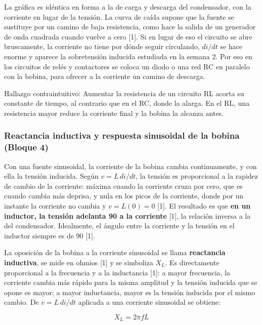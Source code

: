 \documentclass[11pt,letterpaper]{article}
\begin{document}
La gráfica es idéntica en forma a la de carga y descarga del condensador, con la corriente en lugar de la tensión. La curva de caída supone que la fuente se sustituye por un camino de baja resistencia, como hace la salida de un generador de onda cuadrada cuando vuelve a cero [1]. Si en lugar de eso el circuito se abre bruscamente, la corriente no tiene por dónde seguir circulando, $di/dt$ se hace enorme y aparece la sobretensión inducida estudiada en la semana 2. Por eso en los circuitos de relés y contactores se coloca un diodo o una red RC en paralelo con la bobina, para ofrecer a la corriente un camino de descarga.

\begin{nota}{Hallazgo contraintuitivo:}
Aumentar la resistencia de un circuito RL acorta su constante de tiempo, al contrario que en el RC, donde la alarga. En el RL, una resistencia mayor reduce la corriente final y la bobina la alcanza antes.
\end{nota}

\subsubsection{Reactancia inductiva y respuesta sinusoidal de la bobina (Bloque 4)}

Con una fuente sinusoidal, la corriente de la bobina cambia continuamente, y con ella la tensión inducida. Según $v = L\,di/dt$, la tensión es proporcional a la rapidez de cambio de la corriente: máxima cuando la corriente cruza por cero, que es cuando cambia más deprisa, y nula en los picos de la corriente, donde por un instante la corriente no cambia y $v = L(0) = 0$ [1]. El resultado es que \textbf{en un inductor, la tensión adelanta 90\textdegree{} a la corriente} [1], la relación inversa a la del condensador. Idealmente, el ángulo entre la corriente y la tensión en el inductor siempre es de 90\textdegree{} [1].

La oposición de la bobina a la corriente sinusoidal se llama \textbf{reactancia inductiva}, se mide en ohmios [1] y se simboliza $X_L$. Es directamente proporcional a la frecuencia y a la inductancia [1]: a mayor frecuencia, la corriente cambia más rápido para la misma amplitud y la tensión inducida que se opone es mayor; a mayor inductancia, mayor es la tensión inducida por el mismo cambio. De $v = L\,di/dt$ aplicada a una corriente sinusoidal se obtiene:

\begin{equation}
  X_L = 2\pi f L
\end{equation}
\end{document}
